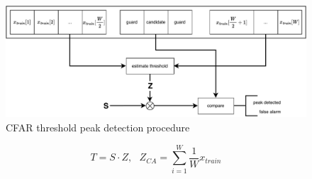 \begin{figure}[h]
	\includegraphics[width=\linewidth]{images/peakdet}
	
	\caption{CFAR threshold peak detection procedure \cite{rohling11}}
	\label{fig:simsig}
\end{figure}

\begin{equation}
	T=S\cdot Z,~~~Z_{CA}=\sum_{i=1}^{W}\dfrac{1}{W}x_{train}
\end{equation}
%
%
